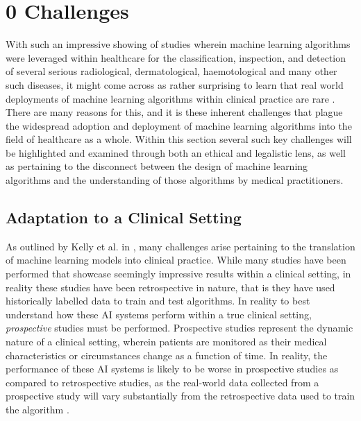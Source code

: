 \documentclass[12pt]{article}
\begin{document}
\setcounter{section}{2}
\section{\hspace{-3mm} 0 Challenges}

With such an impressive showing of studies wherein machine learning algorithms were leveraged within healthcare for the classification, 
inspection, and detection of several serious radiological, dermatological, haemotological and many other such diseases, it might come across as rather
surprising to learn that real world deployments of machine learning algorithms within clinical practice are rare \cite{Kelly_2019}. There are many reasons for this,
and it is these inherent challenges that plague the widespread adoption and deployment of machine learning algorithms into the field of healthcare as a whole. Within this section
several such key challenges will be highlighted and examined through both an ethical and legalistic lens, as well as pertaining to the disconnect between the design of machine learning algorithms 
and the understanding of those algorithms by medical practitioners. \

\vspace{-5mm}
\subsection{Adaptation to a Clinical Setting}

As outlined by Kelly et al. in \cite{Kelly_2019}, many challenges arise pertaining to the translation of machine learning models into clinical practice. While many studies have been performed that showcase 
seemingly impressive results within a clinical setting, in reality these studies have been retrospective in nature, that is they have used historically labelled data to train and test algorithms. In reality 
to best understand how these AI systems perform within a true clinical setting, \textit{prospective} studies must be performed. Prospective studies represent the dynamic nature of a clinical setting,
wherein patients are monitored as their medical characteristics or circumstances change as a function of time. In reality, the performance of these AI systems is likely to be worse in prospective studies 
as compared to retrospective studies, as the real-world data collected from a prospective study will vary substantially from the retrospective data used to train the algorithm \cite{Kelly_2019}. \
\end{document}
